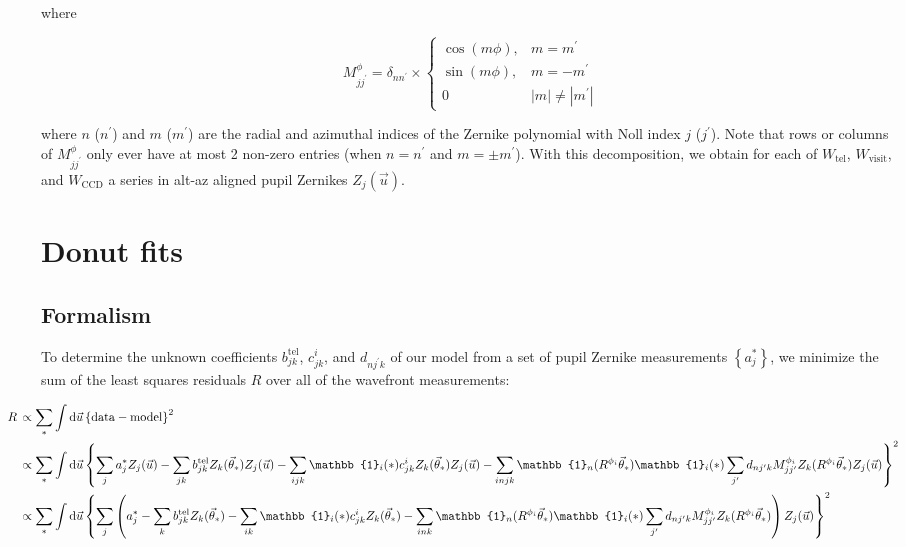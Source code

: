 \documentclass{article}
\begin{document}
where

\begin{equation}
    M_{j j^\prime}^\phi = \delta_{n n^\prime} \times \begin{cases}
    \cos(m \phi), & m = m^\prime \\
    \sin(m \phi), & m = -m^\prime \\
    0 & |m| \ne |m^\prime|
\end{cases}
\end{equation}

where $n$ ($n^\prime$) and $m$ ($m^\prime$) are the radial and azimuthal indices
of the Zernike polynomial with Noll index $j$ ($j^\prime$).  Note that rows or
columns of $M^\phi_{j j^\prime}$ only ever have at most 2 non-zero entries (when
$n = n^\prime$ and $m = \pm m^\prime$).  With this decomposition, we obtain
for each of $W_\mathrm{tel}$, $W_\mathrm{visit}$, and $W_\mathrm{CCD}$ a series
in alt-az aligned pupil Zernikes $Z_j(\vec{u})$.

\section{Donut fits}

\subsection{Formalism}

To determine the unknown coefficients $b^\mathrm{tel}_{jk}$, $c^i_{jk}$, and
$d_{n j^\prime k}$ of our model from a set of pupil Zernike measurements
$\left\{a^*_j\right\}$, we minimize the sum of the least squares residuals $R$
over all of the wavefront measurements:

\begin{equation}
\hspace*{-1cm}
\begin{aligned}
    R\, &\propto \sum_{\ast} \int \dif{\vec{u}} \left\{\mathrm{data} - \mathrm{model}\right\}^2 \\
    &\propto \sum_{\ast}
    \int \dif{\vec{u}} \left\{\sum_j a_j^\ast Z_j(\vec{u})
    - \sum_{jk} b^\mathrm{tel}_{jk} Z_k(\vec{\theta}_\ast) Z_j(\vec{u})
    - \sum_{ijk} \mathbb{1}_i(\ast) c^i_{jk} Z_k(\vec{\theta}_\ast) Z_j(\vec{u})
    - \sum_{injk} \mathbb{1}_n(R^{\phi_i} \vec{\theta}_\ast) \mathbb{1}_i(\ast) \sum_{j^\prime} d_{n j^\prime k} M^{\phi_i}_{j j^\prime} Z_k(R^{\phi_i} \vec{\theta}_\ast) Z_j(\vec{u})
    \right\}^2 \\
    &\propto \sum_{\ast}
    \int \dif{\vec{u}} \left\{\sum_j\left(a_j^\ast
    - \sum_{k} b^\mathrm{tel}_{jk} Z_k(\vec{\theta}_\ast)
    - \sum_{ik} \mathbb{1}_i(\ast) c^i_{jk} Z_k(\vec{\theta}_\ast)
    - \sum_{ink} \mathbb{1}_n(R^{\phi_i} \vec{\theta}_\ast) \mathbb{1}_i(\ast) \sum_{j^\prime} d_{n j^\prime k} M^{\phi_i}_{j j^\prime} Z_k(R^{\phi_i} \vec{\theta}_\ast)
    \right) Z_j(\vec{u})\right\}^2
\end{aligned}
\end{equation}
\end{document}
